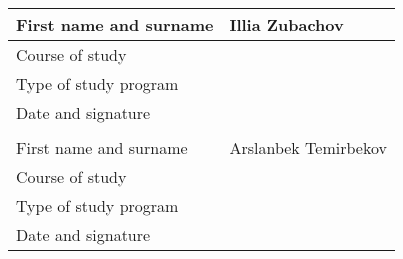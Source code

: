 \documentclass[
    12pt,
    english, %
    singlespacing, %
    oneside, %
]{MastersDoctoralThesis} %
\begin{document}
\begin{partnerdetailspage}
\begin{tabular}{|p{7cm}|p{7cm}|}
            \hline
            First name and surname & Illia Zubachov       \\
            \hline
            Course of study        &                      \\
            \hline
            Type of study program  &                      \\
            \hline
            Date and signature     &                      \\
            \hline

            \multicolumn{2}{c}{\vspace{0.5cm}} \\

            \hline
            First name and surname & Arslanbek Temirbekov \\
            \hline
            Course of study        &                      \\
            \hline
            Type of study program  &                      \\
            \hline
            Date and signature     &                      \\
            \hline
        \end{tabular}
    \end{partnerdetailspage}


%
%


\end{document}
